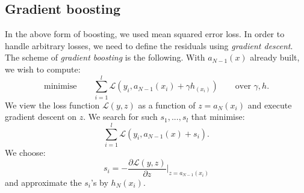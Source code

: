 \newpage
\subsection{Gradient boosting}
In the above form of boosting, we used mean squared error loss. In order to handle arbitrary losses, we need to define the residuals using \textit{gradient descent}.\\

The scheme of \textit{gradient boosting} is the following. With $a_{N-1}(x)$ already built, we wish to compute:
\begin{equation*}
\text{minimise}\qquad \sum_{i=1}^{l} \mathcal{L}(y_i, a_{N-1}(x_i) + \gamma h_(x_i))\qquad \text{over $\gamma, h$}.
\end{equation*}
We view the loss function $\mathcal{L}(y,z)$ as a function of $z = a_N(x_i)$ and execute gradient descent on $z$. We search for such $s_1,...,s_l$ that minimise:
\begin{equation*}
\sum_{i=1}^{l} \mathcal{L}(y_i, a_{N-1}(x) + s_i).
\end{equation*}
We choose:
\begin{equation*}
s_i = - \frac{\partial \mathcal{L}(y,z)}{\partial z} \bigg|_{z = a_{N-1}(x_i)}
\end{equation*}
and approximate the $s_i$'s by $h_N(x_i)$.


\minirule

